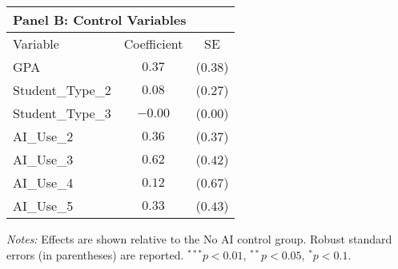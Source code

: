 \begin{table}[!htbp]
\begin{tabular}{lcc}
\multicolumn{3}{l}{\textbf{Panel B: Control Variables}} \\
\hline\hline
Variable & Coefficient & SE \\
\hline
GPA & $0.37$ & ($0.38$) \\
Student_Type_2 & $0.08$ & ($0.27$) \\
Student_Type_3 & $-0.00$ & ($0.00$) \\
AI_Use_2 & $0.36$ & ($0.37$) \\
AI_Use_3 & $0.62$ & ($0.42$) \\
AI_Use_4 & $0.12$ & ($0.67$) \\
AI_Use_5 & $0.33$ & ($0.43$) \\
\hline
\end{tabular}
\begin{tablenotes}
\small
\item \textit{Notes:} Effects are shown relative to the No AI control group. Robust standard errors (in parentheses) are reported. $^{***}p<0.01$, $^{**}p<0.05$, $^{*}p<0.1$.
\end{tablenotes}
\end{table}